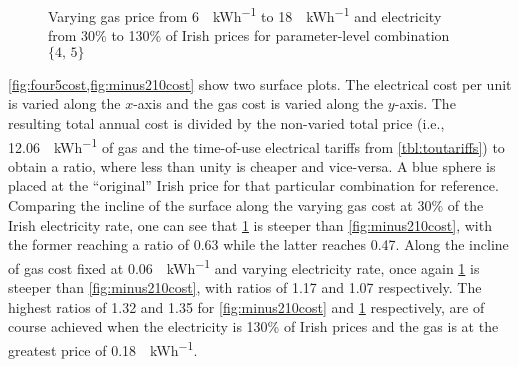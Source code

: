 

\begin{figure}[htb]
    \centering
    \caption{Varying gas price from \qty{6}{\cents\per\kWh} to \qty{18}{\cents\per\kWh} and electricity from 30\% to 130\% of Irish prices for parameter-level combination $\{4\text{, }5\}$}
    \label{fig:four5cost}
\end{figure}

\cref{fig:four5cost,fig:minus210cost} show two surface plots. The electrical cost per unit is varied along the $x$-axis and the gas cost is varied along the $y$-axis. The resulting total annual cost is divided by the non-varied total price (i.e., \qty{12.06}{\cents\per\kWh} of gas and the time-of-use electrical tariffs from \cref{tbl:toutariffs}) to obtain a ratio, where less than unity is cheaper and vice-versa. A blue sphere is placed at the ``original'' Irish price for that particular combination for reference. Comparing the incline of the surface along the varying gas cost at 30\% of the Irish electricity rate, one can see that \cref{fig:four5cost} is steeper than \cref{fig:minus210cost}, with the former reaching a ratio of 0.63 while the latter reaches 0.47. Along the incline of gas cost fixed at \qty{0.06}{\EUR\per\kWh} and varying electricity rate, once again \cref{fig:four5cost} is steeper than \cref{fig:minus210cost}, with ratios of 1.17 and 1.07 respectively. The highest ratios of 1.32 and 1.35 for \cref{fig:minus210cost} and \cref{fig:four5cost} respectively, are of course achieved when the electricity is 130\% of Irish prices and the gas is at the greatest price of \qty{0.18}{\unit{\EUR\per\kWh}}.

